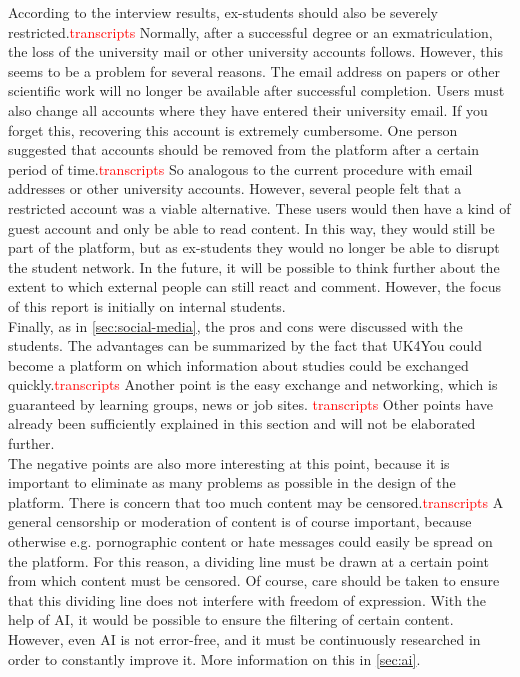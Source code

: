 According to the interview results, ex-students should also be severely restricted.\textcolor{red}{transcripts}
Normally, after a successful degree or an exmatriculation, the loss of the university mail or other university accounts follows.
However, this seems to be a problem for several reasons.
The email address on papers or other scientific work will no longer be available after successful completion.
Users must also change all accounts where they have entered their university email.
If you forget this, recovering this account is extremely cumbersome.
One person suggested that accounts should be removed from the platform after a certain period of time.\textcolor{red}{transcripts}
So analogous to the current procedure with email addresses or other university accounts.
However, several people felt that a restricted account was a viable alternative.
These users would then have a kind of guest account and only be able to read content.
In this way, they would still be part of the platform, but as ex-students they would no longer be able to disrupt the student network.
In the future, it will be possible to think further about the extent to which external people can still react and comment.
However, the focus of this report is initially on internal students.\\

Finally, as in \autoref{sec:social-media}, the pros and cons were discussed with the students.
The advantages can be summarized by the fact that UK4You could become a platform on which information about studies could be exchanged quickly.\textcolor{red}{transcripts}
Another point is the easy exchange and networking, which is guaranteed by learning groups, news or job sites. \textcolor{red}{transcripts}
Other points have already been sufficiently explained in this section and will not be elaborated further.\\

The negative points are also more interesting at this point, because it is important to eliminate as many problems as possible in the design of the platform.
There is concern that too much content may be censored.\textcolor{red}{transcripts}
A general censorship or moderation of content is of course important, because otherwise e.g. pornographic content or hate messages could easily be spread on the platform.
For this reason, a dividing line must be drawn at a certain point from which content must be censored.
Of course, care should be taken to ensure that this dividing line does not interfere with freedom of expression.
With the help of AI, it would be possible to ensure the filtering of certain content.
However, even AI is not error-free, and it must be continuously researched in order to constantly improve it.
More information on this in \autoref{sec:ai}.\\

